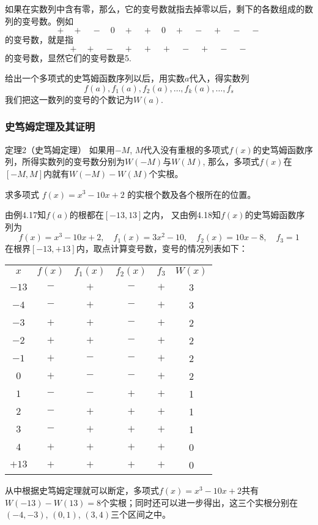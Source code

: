 如果在实数列中含有零，那么，它的变号数就指去掉零以后，剩下的各数组成的数列的变号数。例如
\begin{equation}
    +\quad +\quad -\quad 0\quad +\quad +\quad 0\quad +\quad -\quad +\quad -\quad -
\end{equation}
的变号数，就是指
\begin{equation}
    +\quad +\quad -\quad +\quad +\quad +\quad -\quad +\quad -\quad -
\end{equation}
的变号数，显然它们的变号数是5.

给出一个多项式的史笃姆函数序列以后，用实数$a$代入，得实数列
\[f (a) ,f_1 (a) ,f_2 (a) , \ldots,f_k (a) , \ldots,f_s\] 
我们把这一数列的变号的个数记为$W(a)$.

\subsubsection{史笃姆定理及其证明}

\begin{blk}{定理2（史笃姆定理）}
    如果用$-M$, $M$代入没有重根的多项式$f(x)$的史笃姆函数序列，所得实数列的变号数分别为$W(-M)$与$W(M)$, 那么，多项式$f(x)$在$[-M,M]$内就有$W(-M)-W(M)$个实根。
\end{blk}

\begin{example}
求多项式
$f (x) =x^3-10x+2$
的实根个数及各个根所在的位置。
\end{example}

\begin{solution}
    由例4.17知$f(a)$的根都在$[-13, 13]$之内，
    又由例4.18知$f(x)$的史笃姆函数序列为
\[f (x) =x^3-10x+2,\quad f_1(x) =3x^2-10,\quad f_2 (x) =10x-8,\quad f_3=1\]
在根界$[-13,+13]$内，取点计算变号数，变号的情况列表如下：
\begin{center}
    \begin{tabular}{cccccc}
$x$ & $f(x)$ & $f_1(x)$ & $f_2(x)$ & $f_3$ & $W(x)$\\
$-13$ & $-$ &$+$ & $-$ &$+$&3\\
$-4$ & $-$ &$+$ & $-$ &$+$&3\\
$-3$ & $+$ &$+$ & $-$ &$+$&2\\
$-2$ & $+$ &$+$ & $-$ &$+$&2\\
$-1$ & $+$ &$-$ & $-$ &$+$&2\\
$0$ & $+$ &$-$ & $-$ &$+$&2\\
$1$ & $-$ &$-$ & $+$ &$+$&1\\
$2$ & $-$ &$+$ & $+$ &$+$&1\\
$3$ & $-$ &$+$ & $+$ &$+$&1\\
$4$ & $+$ &$+$ & $+$ &$+$&0\\
$+13$ & $+$ &$+$ & $+$ &$+$&0\\
    \end{tabular}
\end{center}
从中根据史笃姆定理就可以断定，多项式$f(x)=x^3-10x+2$共有$W(-13)-W(13)=8$个实根；同时还可以进一步得出，这三个实根分别在$(-4,-3)$, $(0, 1)$, $(3, 4)$三个区间之中。
\end{solution}

